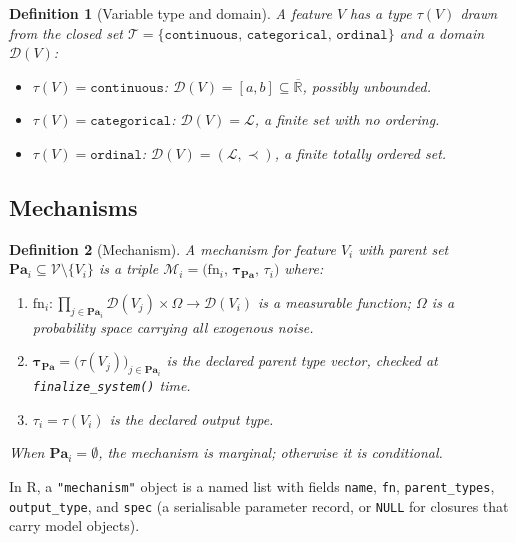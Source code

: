 \documentclass[12pt,a4paper]{article}
\newcommand{\code}[1]{\texttt{#1}}
\newcommand{\proglang}[1]{\textsf{#1}}
\newcommand{\class}[1]{\mbox{\texttt{"#1"}}}
\newcommand{\fct}[1]{\mbox{\texttt{#1()}}}
\newtheorem{definition}{Definition}[section]
\begin{document}
\begin{definition}[Variable type and domain]
\label{def:type}
A \emph{feature} $V$ has a \emph{type} $\tau(V)$ drawn from the closed set
$\mathcal{T} = \{\mathtt{continuous},\, \mathtt{categorical},\, \mathtt{ordinal}\}$
and a \emph{domain} $\mathcal{D}(V)$:
\begin{itemize}[nosep]
  \item $\tau(V) = \mathtt{continuous}$: $\mathcal{D}(V) = [a,b] \subseteq
        \overline{\mathbb{R}}$, possibly unbounded.
  \item $\tau(V) = \mathtt{categorical}$: $\mathcal{D}(V) = \mathcal{L}$, a
        finite set with no ordering.
  \item $\tau(V) = \mathtt{ordinal}$: $\mathcal{D}(V) = (\mathcal{L},\prec)$,
        a finite totally ordered set.
\end{itemize}
\end{definition}

\subsection{Mechanisms}
\label{sec:mech_def}

\begin{definition}[Mechanism]
\label{def:mech}
A \emph{mechanism} for feature $V_i$ with parent set $\mathbf{Pa}_i \subseteq
\mathcal{V}\setminus\{V_i\}$ is a triple
$\mathcal{M}_i = \bigl(\mathrm{fn}_i,\, \boldsymbol\tau_{\mathbf{Pa}},\, \tau_i\bigr)$
where:
\begin{enumerate}[nosep,leftmargin=2em]
  \item $\mathrm{fn}_i : \prod_{j \in \mathbf{Pa}_i}\mathcal{D}(V_j) \times \Omega
        \to \mathcal{D}(V_i)$ is a measurable function; $\Omega$ is a probability
        space carrying all exogenous noise.
  \item $\boldsymbol\tau_{\mathbf{Pa}} = \bigl(\tau(V_j)\bigr)_{j\in\mathbf{Pa}_i}$
        is the \emph{declared parent type vector}, checked at
        \fct{finalize\_system} time.
  \item $\tau_i = \tau(V_i)$ is the declared output type.
\end{enumerate}
When $\mathbf{Pa}_i = \emptyset$, the mechanism is \emph{marginal}; otherwise it
is \emph{conditional}.
\end{definition}

In \proglang{R}, a \class{mechanism} object is a named list with fields
\code{name}, \code{fn}, \code{parent\_types}, \code{output\_type}, and
\code{spec} (a serialisable parameter record, or \code{NULL} for closures that
carry model objects).
\end{document}
